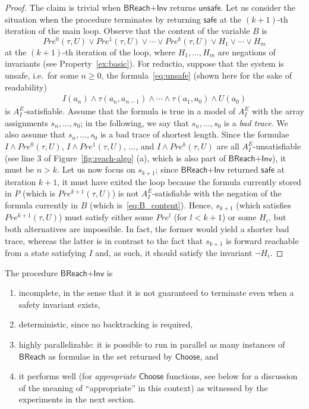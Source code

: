 \documentclass{LMCS}
\theoremstyle{plain}\newtheorem{assumption}[thm]{Assumption}
\theoremstyle{plain}\newtheorem{proposition}[thm]{Proposition}
\theoremstyle{plain}\newtheorem{property}[thm]{Property}
\theoremstyle{plain}\newtheorem{example}[thm]{Example}
\theoremstyle{plain}\newtheorem{claim}[thm]{Claim}
\theoremstyle{plain}\newtheorem{lemma}[thm]{Lemma}
\begin{document}
\begin{proof}
The claim is trivial when $\mathsf{BReach\mbox{+}Inv}$ returns
  $\mathsf{unsafe}$.  Let us consider the situation when the procedure
  terminates by returning $\mathsf{safe}$ at the $(k+1)$-th iteration
  of the main loop.  Observe that the content of the variable $B$ is
  \begin{equation}
    \label{eq:B_content}
    Pre^0(\tau,U)\vee Pre^1(\tau, U)\vee\cdots \vee Pre^k(\tau, U)\vee
    H_1\vee\cdots \vee H_m
  \end{equation}
  at the $(k+1)$-th iteration of the loop, where $H_1, \dots, H_m$ are
  negations of invariants (see Property~\ref{ex:basic}). For reductio,
  suppose that the system is unsafe, i.e.\ for some $n\geq 0$, the
  formula~\eqref{eq:unsafe} (shown here for the sake of readability)
  \begin{eqnarray*}
  I(a_n)\wedge \tau(a_{n}, a_{n-1})\wedge \cdots \wedge \tau(a_{1},
  a_0)\wedge U(a_0)
  \end{eqnarray*}
  is $A_I^E$-satisfiable.  Assume that the formula is true in a model
  of $A^E_I$ with the array assignments $s_n, \dots, s_0$; in the
  following, we say that $s_n, \dots, s_0$ is a \emph{bad trace}.  We
  also assume that $s_n, \dots, s_0$ is a bad trace of shortest
  length.  Since the formulae $I\wedge Pre^0(\tau,U)$, $I\wedge
  Pre^1(\tau, U)$, $\dots$, and $I\wedge Pre^k(\tau, U)$ are all
  $A^E_I$-unsatisfiable (see line 3 of Figure~\ref{fig:reach-algo}
  (a), which is also part of $\mathsf{BReach\mbox{+}Inv}$), it must be
  $n> k$.  Let us now focus on $s_{k+1}$; since
  $\mathsf{BReach\mbox{+}Inv}$ returned $\mathsf{safe}$ at iteration
  $k+1$, it must have exited the loop because the formula currently
  stored in $P$ (which is $Pre^{k+1}(\tau, U)$) is not
  $A^E_I$-satisfiable with the negation of the formula currently in
  $B$ (which is~\eqref{eq:B_content}). Hence, $s_{k+1}$ (which
  satisfies $Pre^{k+1}(\tau, U)$) must satisfy either some $Pre^{l}$
  (for $l<k+1$) or some $H_i$, but both alternatives are
  impossible. In fact, the former would yield a shorter bad trace,
  whereas the latter is in contrast to the fact that $s_{k+1}$ is
  forward reachable from a state satisfying $I$ and, as such, it
  should satisfy the invariant $\neg H_i$.
\end{proof}
The procedure $\mathsf{BReach\mbox{+}Inv}$ is
\begin{enumerate}[$\bullet$]
\item incomplete, in the sense that it is not guaranteed to terminate
  even when a safety invariant exists,
\item deterministic, since no backtracking is required,
\item highly parallelizable: it is possible to run in parallel as many
  instances of $\mathsf{BReach}$ as formulae in the set returned by
  $\mathsf{Choose}$, and
\item it performs well (for \emph{appropriate} $\mathsf{Choose}$
  functions, see below for a discussion of the meaning of
  ``appropriate'' in this context) as witnessed by the experiments in
  the next section.
\end{enumerate}
\end{document}
